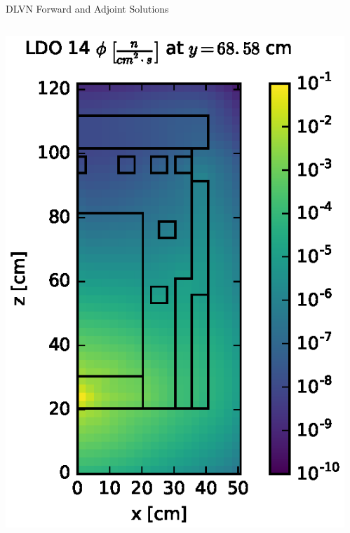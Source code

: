 \documentclass{beamer}
\begin{document}
\begin{frame}{DLVN Forward and Adjoint Solutions}
%
\begin{columns}
\begin{column}{0.45\textwidth}
\includegraphics[width=\textwidth]{img/flux-ldo14-slice.eps}
\end{column}
%
\begin{column}{0.45\textwidth}

\end{column}
\end{columns}
\end{frame}
\end{document}
